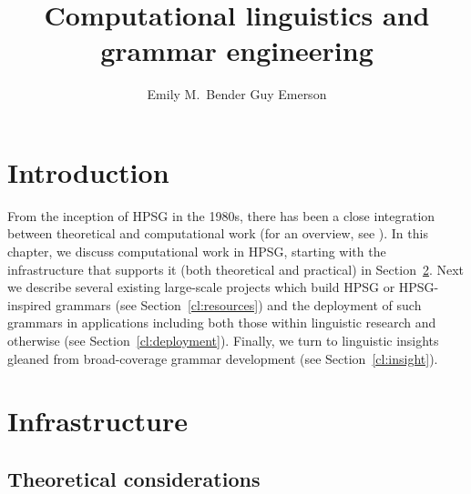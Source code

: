 \documentclass[output=paper,biblatex,babelshorthands,newtxmath,draftmode,colorlinks,citecolor=brown]{langscibook}
\author{Emily M.\ Bender\affiliation{University of Washington} \lastand Guy Emerson\affiliation{University of Cambridge}}
\title{Computational linguistics and grammar engineering}
\begin{document}
\maketitle

\label{chap-cl}

\section{Introduction}

From the inception of HPSG in the 1980s, there has been a close integration between theoretical and
computational work (for an overview, see ).  In this chapter, we
discuss computational work in HPSG, starting with the infrastructure that supports it (both
theoretical and practical) in Section~\ref{cl:infrastructure}.  Next we describe several existing
large-scale projects which build HPSG or HPSG-inspired grammars (see Section~\ref{cl:resources}) and
the deployment of such grammars in applications including both those within linguistic research and
otherwise (see Section~\ref{cl:deployment}).  Finally, we turn to linguistic insights gleaned from
broad-coverage grammar development (see Section~\ref{cl:insight}).

\section{Infrastructure}
\label{cl:infrastructure}

\subsection{Theoretical considerations}
\label{cl:theoretical}
\end{document}
